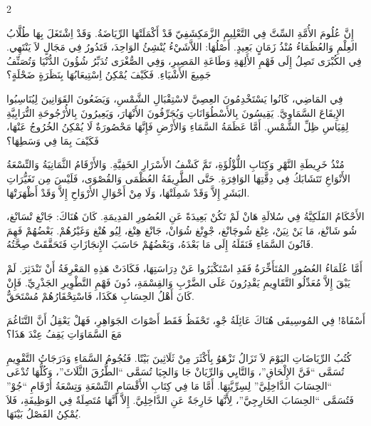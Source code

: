 \documentclass[11pt,a4paper]{article}
\newcommand{\ar}[1]{\arabicfont\beginR #1\endR}
\newenvironment{bilingual}{%
  \begin{paracol}{2}
}{%
  \end{paracol}
}
\begin{document}
\begin{bilingual}
\begin{rightcolumn*}
\ar{إِنَّ عُلُومَ الأُمَّةِ السِّتَّ فِي التَّعْلِيمِ الزَّمَكِشَفِيّ قَدْ أَكْمَلَتْهَا الرِّيَاضَةُ. وَقَدْ اِشْتَغَلَ بِهَا طُلَّابُ العِلْمِ وَالعُظَمَاءُ مُنْذُ زَمَانٍ بَعِيدٍ. أَصْلُهَا: اللاَّشَيْءُ يُنْشِئُ الوَاحِدَ، فَتَدُورُ فِي مَجَالٍ لاَ يَنْتَهِي. فِي الكُبْرَى تَصِلُ إِلَى فَهْمِ الأَلِهَةِ وَطَاعَةِ المَصِيرِ، وَفِي الصُّغْرَى تُدَبِّرُ شُؤُونَ الدُّنْيَا وَتُصَنِّفُ جَمِيعَ الأَشْيَاءِ. فَكَيْفَ يُمْكِنُ اِسْتِيعَابُهَا بِنَظَرَةٍ ضَحْلَةٍ؟}

\ar{فِي المَاضِي، كَانُوا يَسْتَخْدِمُونَ العِصِيَّ لاسْتِقْبَالِ الشَّمْسِ، وَيَضَعُونَ القَوَانِينَ لِيُنَاسِبُوا الإِيقَاعَ السَّمَاوِيَّ. يَقِيسُونَ بِالأَسْطُوَانَاتِ وَيُجَرِّفُونَ الأَنْهَارَ، وَيَعِيرُونَ بِالأُرْجُوحَةِ التُّرَابِيَّةِ لِقِيَاسِ ظِلِّ الشَّمْسِ. أَمَّا عَظَمَةُ السَّمَاءِ وَالأَرْضِ فَإِنَّهَا مَحْصُورَةٌ لَا يُمْكِنُ الخُرُوجُ عَنْهَا، فَكَيْفَ بِمَا فِي وَسَطِهَا؟}

\ar{مُنْذُ خَرِيطَةِ النَّهْرِ وَكِتَابِ اللُّؤْلُؤَةِ، تَمَّ كَشْفُ الأَسْرَارِ الخَفِيَّةِ. وَالأَرْقَامُ الثَّمَانِيَةُ وَالتِّسْعَةُ الأَنْوَاعِ تَتَشَابَكُ فِي دِقَّتِهَا الوَافِرَةِ. حَتَّى الطَّرِيقَةُ العُظْمَى وَالقُصْوَى، فَلَيْسَ مِن تَغَيُّرَاتِ البَشَرِ إِلاَّ وَقَدْ شَمِلَتْهَا، وَلَا مِنْ أَحْوَالِ الأَرْوَاحِ إِلاَّ وَقَدْ أَظْهَرَتْهَا.}

\ar{الأَحْكَامُ الفَلَكِيَّةُ فِي سُلالَةِ هَانْ لَمْ تَكُنْ بَعِيدَةً عَنِ العُصُورِ القدِيمَةِ. كَانَ هُنَاكَ: جَانْغ تْسَانْغ، شُو شَانْغ، مَا يَنْ نِيَنْ، غِنْغ شُوچَانْغ، جْوِنْغ شُوَانْ، جَانْغ هِنْغ، لِيُو هُنْغ وَغَيْرُهُمْ. بَعْضُهُمْ فَهِمَ قَانُونَ السَّمَاءِ فَنَقَلَهُ إِلَى مَا بَعْدَهُ، وَبَعْضُهُمْ حَاسَبَ الإِنجَازَاتِ فَتَحَقَّقَتْ صِحَّتُهُ.}

\ar{أَمَّا عُلَمَاءُ العُصُورِ المُتَأَخِّرَةُ فَقَدِ اسْتَكْبَرُوا عَنْ دِرَاسَتِهَا، فَكَادَتْ هَذِهِ المَعْرِفَةُ أَنْ تَنْدَثِرَ. لَمْ يَبْقَ إِلاَّ مُعَدِّلُو التَّقَاوِيمِ يَقْدِرُونَ عَلَى الضَّرْبِ وَالقِسْمَةِ، دُونَ فَهْمِ التَّطْوِيرِ الجَذْرِيِّ. فَإِنْ كَانَ أَهْلُ الحِسَابِ هَكَذَا، فَاسْتِحْقَارُهُمْ مُسْتَحَقٌّ.}

\ar{أَسْفَاهْ! فِي المُوسِيقَى هُنَاكَ عَائِلَةُ جْوِ، تَحْفَظُ فَقَط أَصْوَاتَ الجَوَاهِرِ، فَهَلْ يَعْقِلُ أَنَّ التَّنَاغُمَ مَعَ السَّمَاوَاتِ يَقِفُ عِنْدَ هَذَا؟}

\ar{كُتُبُ الرِّيَاضَاتِ اليَوْمَ لاَ تَزَالُ تَزْهَوُ بِأَكْثَرَ مِنْ ثَلَاثِينَ بَيْتًا. فَنُجُومُ السَّمَاءِ وَدَرَجَاتُ التَّقْوِيمِ تُسَمَّى \enquote{فَنَّ الإِلْحَاقِ}، وَالتَّايِي وَالرِّيَانْ جَا وَالجِيَا تُسَمَّى \enquote{الطُّرُقَ الثَّلَاثَ}، وَكُلُّهَا تُدْعَى \enquote{الحِسَابَ الدَّاخِلِيَّ} لِسِرِّيَّتِهَا. أَمَّا مَا فِي كِتَابِ الأَقْسَامِ التِّسْعَةِ وَتِسْعَةُ أَرْقَامِ \enquote{جُوْ} فَتُسَمَّى \enquote{الحِسَابَ الخَارِجِيَّ}، لِأَنَّهَا خَارِجَةٌ عَنِ الدَّاخِلِيَّ. إِلاَّ أَنَّهَا مُتَصِلَةٌ فِي الوَظِيفَةِ، فَلاَ يُمْكِنُ الفَصْلُ بَيْنَهَا.}


\end{rightcolumn*}
\end{bilingual}
\end{document}
